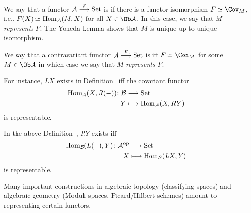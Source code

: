 \documentclass[a4paper,parskip=half,numbers=enddot, DIV=12]{scrreprt}
\begin{document}
  \begin{defi}
  	\begin{alphanumerate}
  		\item We say that a functor $\Aa\morphism[F] \cat{Set}$ is  if there is a functor-isomorphism $F\simeq \Cov_M$, i.e., $F(X) \simeq \operatorname{Hom}_{\mathcal{A}}(M,X)$ for all $X\in\Ob\Aa$. In this case, we say that $M$ \emph{represents} $F$. The Yoneda-Lemma shows that $M$ is unique up to unique isomorphism.
  		\item We say that a contravariant functor $\Aa\morphism[F]\cat{Set}$ is  iff $F\simeq \Con_M$ for some $M\in\Ob\Aa$ in which case we say that $M$ \emph{represents} $F$.
  	\end{alphanumerate}
  \end{defi}
  \begin{rem*}
  	\begin{alphanumerate}
  		\item  For instance, $LX$ exists in Definition~ iff the covariant functor 
  		\begin{align*}
  		\Hom_\Aa(X,R(-))\colon\Bb&\morphism\cat{Set}\\
  		Y &\longmapsto \Hom_\Aa(X, RY)
  		\end{align*}
  		is representable.
  		\item
  		In the above Definition~, $RY$ exists iff 
  		\begin{align*}
  		\Hom_\Bb(L(-), Y)\colon\Aa^\op&\morphism\cat{Set}\\
  		X&\longmapsto \Hom_\Bb(LX,Y)
  		\end{align*}
  		is representable.
  		\item 
  		Many important constructions in algebraic topology (classifying spaces) and algebraic geometry (Moduli spaces, Picard/Hilbert schemes) amount to representing certain functors.
  	\end{alphanumerate}
  \end{rem*}
\end{document}
